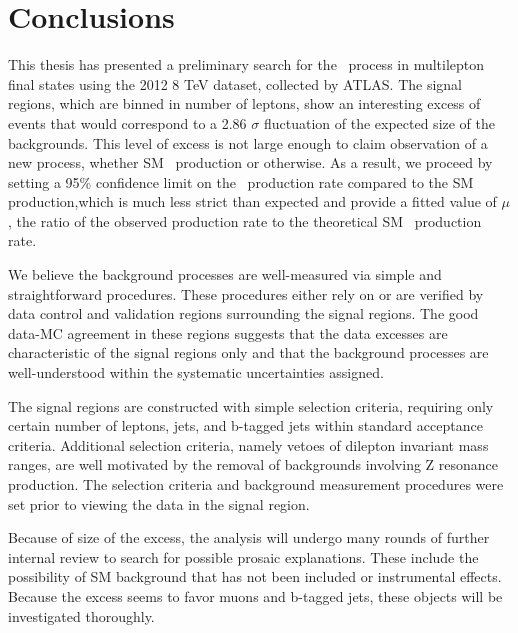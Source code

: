 \chapter[Conclusions][Conclusions]{Conclusions}

This thesis has presented a preliminary search for the \tth\ process in multilepton
final states using the 2012 8 TeV dataset, collected by ATLAS. The signal regions,
which are binned in number of leptons, show an interesting excess of events that would correspond to a 2.86 $\sigma$ fluctuation
of the expected size of the backgrounds. This level of excess is not large enough
to claim observation of a new process, whether SM \tth\ production or otherwise. As
a result, we proceed by setting a 95\% confidence limit on the \tth\ production rate
compared to the SM production,which is much less strict than expected and provide a fitted value of $\mu$,
the ratio of the observed production rate to the theoretical SM \tth\ production rate.

We believe the background processes are well-measured via simple and 
straightforward procedures. These procedures either rely on or are verified by
data control and validation regions surrounding the signal regions. The good
data-MC agreement in these regions suggests that the data excesses are characteristic
of the signal regions only and that the background processes are well-understood
within the systematic uncertainties assigned. 

The signal regions are constructed with simple selection criteria, requiring 
only certain number of leptons, jets, and b-tagged jets within standard
acceptance criteria. Additional selection criteria, namely vetoes of
dilepton invariant mass ranges, are well motivated by the removal
of backgrounds involving Z resonance production. The selection criteria
and background measurement procedures were set prior to viewing the 
data in the signal region.

Because of size of the excess, the analysis will undergo many rounds 
of further internal review to search for possible prosaic explanations. These 
include the possibility of SM background that has not been included or instrumental
effects. Because the excess seems to favor muons and b-tagged jets, these objects
will be investigated thoroughly. 

